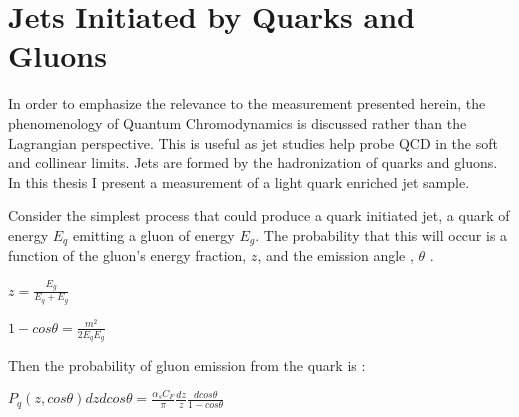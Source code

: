 
\section{Jets Initiated by Quarks and Gluons }\label{sec:quarkandgluonjets}











In order to emphasize the relevance to the measurement presented herein, the phenomenology of Quantum Chromodynamics is discussed rather than the Lagrangian perspective. This is useful as jet studies help probe QCD in the soft and collinear limits. 
Jets are formed by the hadronization of quarks and gluons. In this thesis I present a measurement of a light quark enriched jet sample. 



Consider the simplest process that could produce a quark initiated jet, a quark of energy $E_q$  emitting a gluon of energy $E_g$. The probability that this will occur is a function of the gluon's energy fraction, $z$, and the emission angle , $\theta$  \cite{Larkoski:2017fip}.\newline


$z = \frac{E_g}{E_q + E_g}$\newline

$1 - cos \theta = \frac{m^2}{2 E_q E_g}$\newline

Then the probability of gluon emission from the quark is :


$P_q(z,cos \theta) dz d cos \theta = \frac{\alpha_s C_F}{\pi}  \frac{dz}{z} \frac{dcos \theta}{1 - cos \theta}  $\newline

